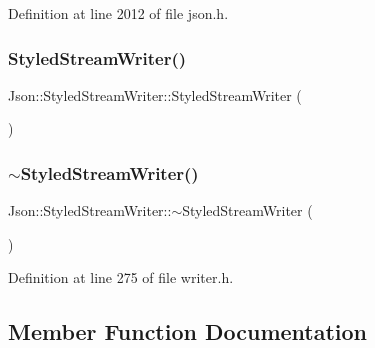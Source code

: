 Definition at line 2012 of file json.\+h.

\hypertarget{class_json_1_1_styled_stream_writer_a5e41c4e40f11266046bd0ea8f8f5a75e}{}\label{class_json_1_1_styled_stream_writer_a5e41c4e40f11266046bd0ea8f8f5a75e} 
\subsubsection{\texorpdfstring{Styled\+Stream\+Writer()}{StyledStreamWriter()}\hspace{0.1cm}{\footnotesize\ttfamily [2/2]}}
{\footnotesize\ttfamily Json\+::\+Styled\+Stream\+Writer\+::\+Styled\+Stream\+Writer (\begin{DoxyParamCaption}{ }\end{DoxyParamCaption})}

\hypertarget{class_json_1_1_styled_stream_writer_a17444a59f617970279714e97b0ddfa46}{}\label{class_json_1_1_styled_stream_writer_a17444a59f617970279714e97b0ddfa46} 
\subsubsection{\texorpdfstring{$\sim$\+Styled\+Stream\+Writer()}{~StyledStreamWriter()}\hspace{0.1cm}{\footnotesize\ttfamily [2/2]}}
{\footnotesize\ttfamily Json\+::\+Styled\+Stream\+Writer\+::$\sim$\+Styled\+Stream\+Writer (\begin{DoxyParamCaption}{ }\end{DoxyParamCaption})\hspace{0.3cm}{\ttfamily [inline]}}



Definition at line 275 of file writer.\+h.



\subsection{Member Function Documentation}
\hypertarget{class_json_1_1_styled_stream_writer_ad2892f57171919fa4f8a5ae5574755cf}{}\label{class_json_1_1_styled_stream_writer_ad2892f57171919fa4f8a5ae5574755cf} 
